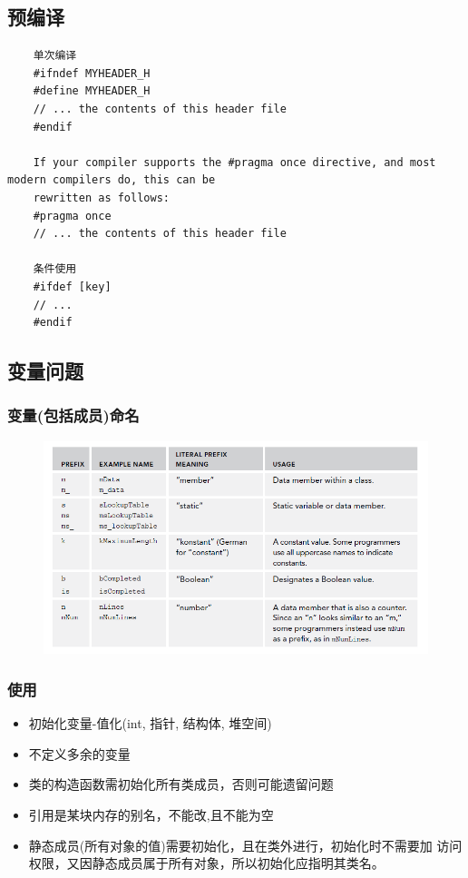 \documentclass[UTF8,a4paper,12pt]{ctexbook} %
\begin{document}
		\subsection{预编译}
			\begin{lstlisting}
	单次编译
	#ifndef MYHEADER_H
	#define MYHEADER_H
	// ... the contents of this header file
	#endif
	
	If your compiler supports the #pragma once directive, and most modern compilers do, this can be
	rewritten as follows:
	#pragma once
	// ... the contents of this header file
	
	条件使用
	#ifdef [key]
	// ...
	#endif
			\end{lstlisting}
				
		\subsection{变量问题}
			\subsubsection{变量(包括成员)命名}
				\begin{figure}[H]
					\centering
					\includegraphics[scale = 0.6]{Naming.png}
				\end{figure}

			\subsubsection{使用}
			\begin{itemize}
				\item 初始化变量-值化(int, 指针, 结构体,  堆空间)
				\item 不定义多余的变量  
				\item 类的构造函数需初始化所有类成员，否则可能遗留问题
				\item 引用是某块内存的别名，不能改,且不能为空
				\item 静态成员(所有对象的值)需要初始化，且在类外进行，初始化时不需要加 访问权限，又因静态成员属于所有对象，所以初始化应指明其类名。
			\end{itemize}
\end{document}
